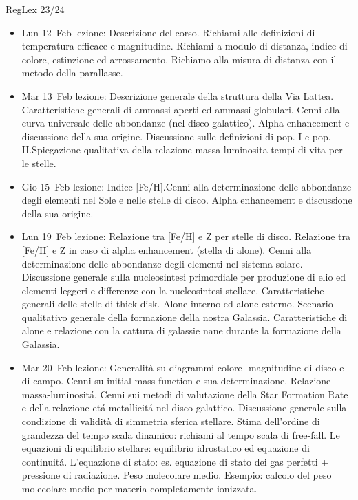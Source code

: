 \begin{frame}[allowframebreaks]{RegLex 23/24}

\begin{itemize}
\item Lun 12 Feb lezione: Descrizione del corso. Richiami alle definizioni di temperatura efficace e magnitudine. Richiami a modulo di distanza, indice di colore, estinzione ed arrossamento. Richiamo alla misura di distanza con il metodo della parallasse. 
\item Mar 13 Feb lezione: Descrizione generale della struttura della Via Lattea. Caratteristiche generali di ammassi aperti ed ammassi globulari. Cenni alla curva universale delle abbondanze (nel disco galattico). Alpha enhancement e discussione della sua origine. Discussione sulle definizioni di pop. I e pop. II.Spiegazione qualitativa della relazione massa-luminosita-tempi di vita per le stelle. 
\item Gio 15 Feb lezione: Indice [Fe/H].Cenni alla determinazione delle abbondanze degli elementi nel Sole e nelle stelle di disco. Alpha enhancement e discussione della sua origine. 
\item Lun 19 Feb lezione: Relazione tra [Fe/H] e Z per stelle di disco. Relazione tra [Fe/H] e Z in caso di alpha enhancement (stella di alone). Cenni alla determinazione delle abbondanze degli elementi nel sistema solare. Discussione generale sulla nucleosintesi primordiale per produzione di elio ed elementi leggeri e differenze con la nucleosintesi stellare. Caratteristiche generali delle stelle di thick disk. Alone interno ed alone esterno. Scenario qualitativo generale della formazione della nostra Galassia. Caratteristiche di alone e relazione con la cattura di galassie nane durante la formazione della Galassia. 
\item Mar 20 Feb lezione: Generalità su diagrammi colore- magnitudine di disco e di campo. Cenni su initial mass function e sua determinazione. Relazione massa-luminosit\'a. Cenni sui metodi di valutazione della Star Formation Rate e della relazione et\'a-metallicit\'a nel disco galattico. Discussione generale sulla condizione di validità di simmetria sferica stellare. Stima dell'ordine di grandezza del tempo scala dinamico: richiami al tempo scala di free-fall. Le equazioni di equilibrio stellare: equilibrio idrostatico ed equazione di continuit\'a. L'equazione di stato: es. equazione di stato dei gas perfetti + pressione di radiazione. Peso molecolare medio. Esempio: calcolo del peso molecolare medio per materia completamente ionizzata. 

\end{itemize}
\end{frame}
